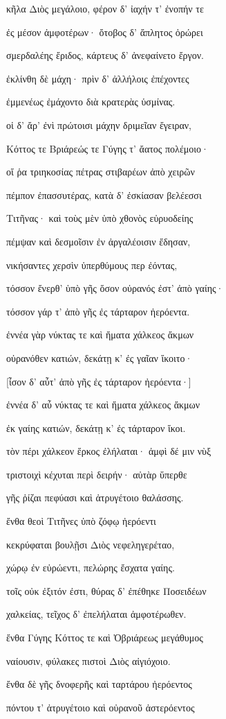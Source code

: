 \begin{pages}
\begin{Leftside}
κῆλα Διὸς μεγάλοιο, φέρον δ' ἰαχήν τ' ἐνοπήν τε

ἐς μέσον ἀμφοτέρων· ὄτοβος δ' ἄπλητος ὀρώρει 

σμερδαλέης ἔριδος, κάρτευς δ' ἀνεφαίνετο ἔργον. 

ἐκλίνθη δὲ μάχη· πρὶν δ' ἀλλήλοις ἐπέχοντες 

ἐμμενέως ἐμάχοντο διὰ κρατερὰς ὑσμίνας.

οἱ δ' ἄρ' ἐνὶ πρώτοισι μάχην δριμεῖαν ἔγειραν, 

Κόττος τε Βριάρεώς τε Γύγης τ' ἄατος πολέμοιο·

οἵ ῥα τριηκοσίας πέτρας στιβαρέων ἀπὸ χειρῶν  

πέμπον ἐπασσυτέρας, κατὰ δ' ἐσκίασαν βελέεσσι

Τιτῆνας· καὶ τοὺς μὲν ὑπὸ χθονὸς εὐρυοδείης 

πέμψαν καὶ δεσμοῖσιν ἐν ἀργαλέοισιν ἔδησαν,

νικήσαντες χερσὶν ὑπερθύμους περ ἐόντας, 

τόσσον ἔνερθ' ὑπὸ γῆς ὅσον οὐρανός ἐστ' ἀπὸ γαίης·  

τόσσον γάρ τ' ἀπὸ γῆς ἐς τάρταρον ἠερόεντα.

ἐννέα γὰρ νύκτας τε καὶ ἤματα χάλκεος ἄκμων

οὐρανόθεν κατιών, δεκάτῃ κ' ἐς γαῖαν ἵκοιτο· 

{[}ἶσον δ' αὖτ' ἀπὸ γῆς ἐς τάρταρον ἠερόεντα·{]}

ἐννέα δ' αὖ νύκτας τε καὶ ἤματα χάλκεος ἄκμων

ἐκ γαίης κατιών, δεκάτῃ κ' ἐς τάρταρον ἵκοι.  

τὸν πέρι χάλκεον ἕρκος ἐλήλαται· ἀμφὶ δέ μιν νὺξ 

τριστοιχὶ κέχυται περὶ δειρήν· αὐτὰρ ὕπερθε

γῆς ῥίζαι πεφύασι καὶ ἀτρυγέτοιο θαλάσσης.

ἔνθα θεοὶ Τιτῆνες ὑπὸ ζόφῳ ἠερόεντι

κεκρύφαται βουλῇσι Διὸς νεφεληγερέταο,  

χώρῳ ἐν εὐρώεντι, πελώρης ἔσχατα γαίης.

τοῖς οὐκ ἐξιτόν ἐστι, θύρας δ' ἐπέθηκε Ποσειδέων 

χαλκείας, τεῖχος δ' ἐπελήλαται ἀμφοτέρωθεν.

ἔνθα Γύγης Κόττος τε καὶ Ὀβριάρεως μεγάθυμος 

ναίουσιν, φύλακες πιστοὶ Διὸς αἰγιόχοιο. 

ἔνθα δὲ γῆς δνοφερῆς καὶ ταρτάρου ἠερόεντος 

πόντου τ' ἀτρυγέτοιο καὶ οὐρανοῦ ἀστερόεντος


\end{Leftside}
\end{pages}
